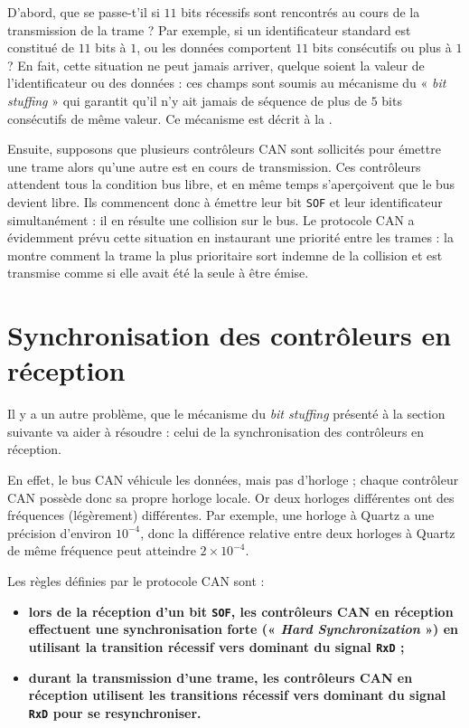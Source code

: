 D'abord, que se passe-t'il si $11$ bits récessifs sont rencontrés au cours de la transmission de la trame ? Par exemple, si un identificateur standard est constitué de $11$ bits à $1$, ou les données comportent $11$ bits consécutifs ou plus à $1$ ? En fait, cette situation ne peut jamais arriver, quelque soient la valeur de l'identificateur ou des données : ces champs sont soumis au mécanisme du « \emph{bit stuffing} » qui garantit qu'il n'y ait jamais de séquence de plus de $5$ bits consécutifs de même valeur. Ce mécanisme est décrit à la .

Ensuite, supposons que plusieurs contrôleurs CAN sont sollicités pour émettre une trame alors qu'une autre est en cours de transmission. Ces contrôleurs attendent tous la condition bus libre, et en même temps s'aperçoivent que le bus devient libre. Ils commencent donc à émettre leur bit \texttt{SOF} et leur identificateur simultanément : il en résulte une collision sur le bus. Le protocole CAN a évidemment prévu cette situation en instaurant une priorité entre les trames : la  montre comment la trame la plus prioritaire sort indemne de la collision et est transmise comme si elle avait été la seule à être émise. 








\section{Synchronisation des contrôleurs en réception}

Il y a un autre problème, que le mécanisme du \emph{bit stuffing} présenté à la section suivante va aider à résoudre : celui de la synchronisation des contrôleurs en réception.

En effet, le bus CAN véhicule les données, mais pas d'horloge ; chaque contrôleur CAN possède donc sa propre horloge locale. Or deux horloges différentes ont des fréquences (légèrement) différentes. Par exemple, une horloge à Quartz a une précision d'environ $10^{-4}$, donc la différence relative entre deux horloges à Quartz de même fréquence peut atteindre $2\times10^{-4}$.

Les règles définies par le protocole CAN sont :
\begin{itemize}
\item {\bf lors de la réception d'un bit \texttt{SOF}, les contrôleurs CAN en réception effectuent une synchronisation forte (« \emph{Hard Synchronization} ») en utilisant la transition récessif vers dominant du signal \texttt{RxD} ;} 
\item {\bf durant la transmission d'une trame, les contrôleurs CAN en réception utilisent les transitions récessif vers dominant du signal \texttt{RxD} pour se resynchroniser.} 
\end{itemize}

